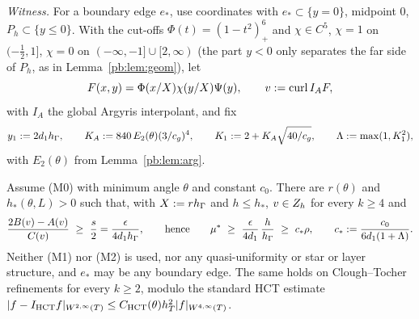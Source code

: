 \emph{Witness.} For a boundary edge $e_\ast$, use coordinates with $e_\ast\subset\{y=0\}$, midpoint $0$, $P_h\subset\{y\le0\}$. With the cut-offs $\Phi(t)=(1-t^2)^6_+$ and $\chi\in C^5$, $\chi=1$ on $(-\frac12,1]$, $\chi=0$ on $(-\infty,-1]\cup[2,\infty)$ (the part $y<0$ only separates the far side of $P_h$, as in Lemma~\ref{pb:lem:geom}), let
\[
F(x,y)=\Phi(x/X)\chi(y/X)\Psi(y),\qquad v:=\operatorname{curl} I_AF,
\]
with $I_A$ the global Argyris interpolant, and fix
\[
y_1:=2d_1h_\Gamma,\qquad K_A:=840\,E_2(\theta)(3/c_g)^4,\qquad K_1:=2+K_A\sqrt{40/c_g},\qquad \Lambda:=\max(1,K_1^2),
\]
with $E_2(\theta)$ from Lemma~\ref{pb:lem:arg}.

\begin{theorem}\label{pb:thmM0}
Assume (M0) with minimum angle $\theta$ and constant $c_0$. There are $r(\theta)$ and $h_\ast(\theta,L)>0$ such that, with $X:=rh_\Gamma$ and $h\le h_\ast$, $v\in Z_h$ for every $k\ge4$ and
\[
\frac{2B(v)-A(v)}{C(v)}\ \ge\ \frac s2=\frac{\epsilon}{4d_1\hG},\qquad\text{hence}\qquad
\mu^\ast\ \ge\ \frac{\epsilon}{4d_1}\,\frac h{\hG}\ \ge\ c_\ast\rho,\qquad c_\ast:=\frac{c_0}{6d_1(1+\Lambda)} .
\]
Neither (M1) nor (M2) is used, nor any quasi-uniformity or star or layer structure, and $e_\ast$ may be any boundary edge. The same holds on Clough--Tocher refinements for every $k\ge2$, modulo the standard HCT estimate $|f-I_{\rm HCT}f|_{W^{2,\infty}(T)}\le C_{\rm HCT}(\theta)h_T^2|f|_{W^{4,\infty}(T)}$.
\end{theorem}


